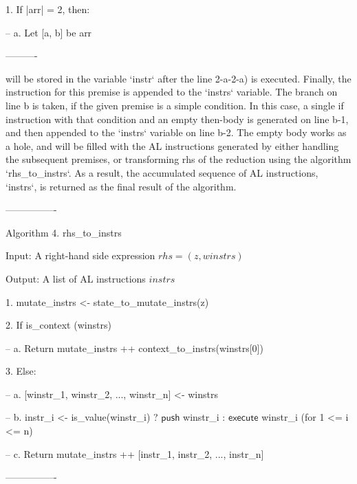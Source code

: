 1. If |arr| = 2, then:

-- a. Let [a, b] be arr

----------

will be stored in the variable `instr` after the line 2-a-2-a) is executed.
Finally, the instruction for this premise is appended to the `instrs` variable.
The branch on line b is taken, if the given premise is a simple condition.
In this case, a single if instruction with that condition and an empty then-body is generated on line
b-1, and then appended to the `instrs` variable on line b-2. The empty body works as
a hole, and will be filled with
the AL instructions generated by either handling the subsequent premises, or transforming
rhs of the reduction using the algorithm `rhs\_to\_instrs`. As a result, the accumulated
sequence of AL instructions, `instrs`, is returned as the final result of the algorithm.

----------------

Algorithm 4. rhs\_to\_instrs

Input: A right-hand side expression $rhs = (z, winstrs)$

Output: A list of AL instructions $instrs$

1. mutate\_instrs <- state\_to\_mutate\_instrs(z)

2. If is\_context (winstrs)

-- a. Return mutate\_instrs ++ context\_to\_instrs(winstrs[0])

3. Else:

-- a. [winstr\_1, winstr\_2, ..., winstr\_n] <- winstrs

-- b. instr\_i <- is\_value(winstr\_i) ? $\mathsf{push}$ winstr\_i : $\mathsf{execute}$ winstr\_i  (for 1 <= i <= n)

-- c. Return mutate\_instrs ++ [instr\_1, instr\_2, ..., instr\_n]

----------------

